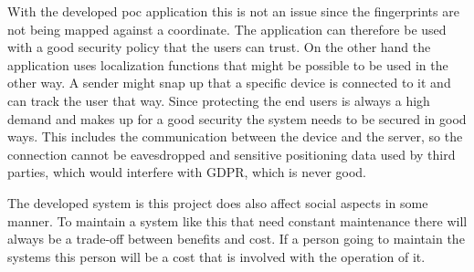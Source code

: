 \bigskip

With the developed \acrshort{poc} application this is not an issue since the fingerprints are not being mapped against a coordinate.
The application can therefore be used with a good security policy that the users can trust.
On the other hand the application uses localization functions that might be possible to be used in the other way.
A sender might snap up that a specific device is connected to it and can track the user that way.
Since protecting the end users is always a high demand and makes up for a good security the system needs to be secured in good ways.
This includes the communication between the device and the server, so the connection cannot be eavesdropped and sensitive positioning data used by third parties, which would interfere with GDPR, which is never good.

\bigskip

The developed system is this project does also affect social aspects in some manner.
To maintain a system like this that need constant maintenance there will always be a trade-off between benefits and cost.
If a person going to maintain the systems this person will be a cost that is involved with the operation of it.

